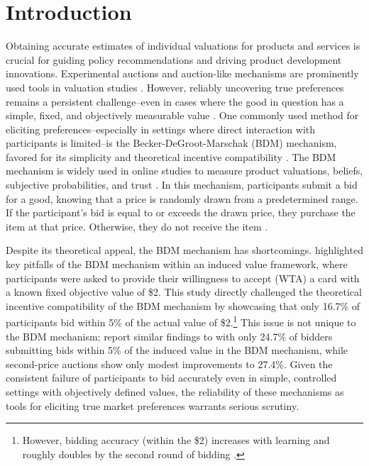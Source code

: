 \documentclass[12pt]{article}
\begin{document}
\section{Introduction}
Obtaining accurate estimates of individual valuations for products and services is crucial for guiding policy recommendations and driving product development innovations. Experimental auctions and auction-like mechanisms are prominently used tools in valuation studies \citep{lusk2007experimental,canavari2019run}. However, reliably uncovering true preferences remains a persistent challenge--even in cases where the good in question has a simple, fixed, and objectively measurable value \citep{drichoutis2022game, cason_misconceptions_2014}. One commonly used method for eliciting preferences--especially in settings where direct interaction with participants is limited--is the Becker-DeGroot-Marschak (BDM) mechanism,  favored for its simplicity and theoretical incentive compatibility \citep{mamadehussene2023reliability, azrieli2018incentives}. The BDM mechanism is widely used in online studies to measure product valuations, beliefs, subjective probabilities, and trust  \citep{mamadehussene2023reliability, ahles_testing_2024, burdea2022online}. In this mechanism, participants submit a bid for a good, knowing that a price is randomly drawn from a predetermined range. If the participant's bid is equal to or exceeds the drawn price, they purchase the item at that price. Otherwise, they do not receive the item \citep{becker_measuring_1964}.

Despite its theoretical appeal, the BDM mechanism has shortcomings. %
\citet{cason_misconceptions_2014} highlighted key pitfalls of the BDM mechanism within an induced value framework, where participants were asked to provide their willingness to accept (WTA) a card with a known fixed objective value of \$2. This study directly challenged the theoretical incentive compatibility of the BDM mechanism by showcasing that only 16.7\% of participants bid within 5\% of the actual value of \$2.\footnote{However, bidding accuracy (within the \$2) increases with learning and roughly doubles by the second round of bidding \cite{cason_misconceptions_2014}.} This issue is not unique to the BDM mechanism; \citet{DrichoutisEtAl2024incentives} report similar findings to \citet{cason_misconceptions_2014} with only 24.7\% of bidders submitting bids within 5\% of the induced value in the BDM mechanism, while second-price auctions show only modest improvements to 27.4\%. Given the consistent failure of participants to bid accurately even in simple, controlled settings with objectively defined values, the reliability of these mechanisms as tools for eliciting true market preferences warrants serious scrutiny.
\end{document}
